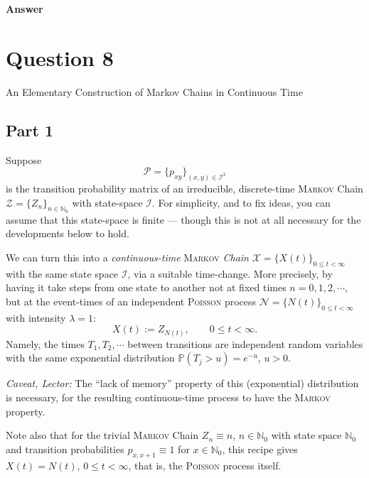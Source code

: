 \documentclass[letterpaper]{article}
\begin{document}
		
		\textbf{Answer}
		
		\clearpage
		
		\section{Question 8}
		
		
		{\color{deepred}  An Elementary Construction of Markov Chains in Continuous Time}
		
		\subsection{Part 1}
		
		 Suppose
		\[
		\mathcal{P} = \{p_{xy}\}_{(x,y) \in \mathcal{I}^2}
		\]
		is the transition probability matrix of an irreducible, discrete-time \textsc{Markov} Chain $\mathcal{Z} = \{Z_n\}_{n \in \mathbb{N}_0}$ with state-space $\mathcal{I}$. For simplicity, and to fix ideas, you can assume that this state-space is finite --- though this is not at all necessary for the developments below to hold.
		
		\indent We can turn this into a \textit{continuous-time} \textsc{Markov} \textit{Chain} $\mathcal{X} = \{X(t)\}_{0 \leq t < \infty}$ with the same state space $\mathcal{I}$, via a suitable time-change. More precisely, by having it take steps from one state to another not at fixed times $n = 0, 1, 2, \cdots$, but at the event-times of an independent \textsc{Poisson} process $\mathcal{N} = \{N(t)\}_{0 \leq t < \infty}$ with intensity $\lambda = 1$:
		\begin{equation}
			X(t) := Z_{N(t)}, \qquad 0 \leq t < \infty. \tag{0.1}
		\end{equation}
		Namely, the times $T_1, T_2, \cdots$ between transitions are independent random variables with the same exponential distribution $\mathbb{P}(T_j > u) = e^{-u}$, $u > 0$.
		
		\textit{Caveat, Lector:} The ``lack of memory'' property of this (exponential) distribution is necessary, for the resulting continuous-time process to have the \textsc{Markov} property.
		
		\indent Note also that for the trivial \textsc{Markov} Chain $Z_n \equiv n$, $n \in \mathbb{N}_0$ with state space $\mathbb{N}_0$ and transition probabilities $p_{x,x+1} \equiv 1$ for $x \in \mathbb{N}_0$, this recipe gives $X(t) = N(t)$, $0 \leq t < \infty$, that is, the \textsc{Poisson} process itself.
		
\end{document}
